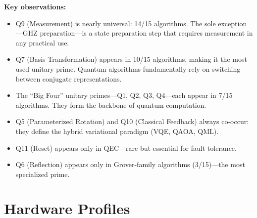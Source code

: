 \documentclass[11pt]{article}
\begin{document}
\textbf{Key observations:}

\begin{itemize}[leftmargin=*]
\item Q9 (Measurement) is nearly universal: 14/15 algorithms. The sole exception---GHZ preparation---is a state preparation step that requires measurement in any practical use.
\item Q7 (Basis Transformation) appears in 10/15 algorithms, making it the most used unitary prime. Quantum algorithms fundamentally rely on switching between conjugate representations.
\item The ``Big Four'' unitary primes---Q1, Q2, Q3, Q4---each appear in 7/15 algorithms. They form the backbone of quantum computation.
\item Q5 (Parameterized Rotation) and Q10 (Classical Feedback) always co-occur: they define the hybrid variational paradigm (VQE, QAOA, QML).
\item Q11 (Reset) appears only in QEC---rare but essential for fault tolerance.
\item Q6 (Reflection) appears only in Grover-family algorithms (3/15)---the most specialized prime.
\end{itemize}

\section{Hardware Profiles}
\label{sec:hardware}
\end{document}
